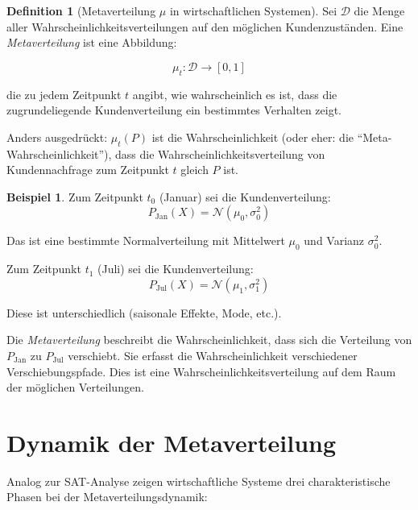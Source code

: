 \documentclass[12pt, a4paper, titlepage]{report}
\theoremstyle{definition}
\newtheorem{definition}[theorem]{Definition}
\newtheorem{example}[theorem]{Beispiel}
\theoremstyle{remark}
\begin{document}
\begin{definition}[Metaverteilung $\mu$ in wirtschaftlichen Systemen]
Sei $\mathcal{D}$ die Menge aller Wahrscheinlichkeitsverteilungen auf den möglichen Kundenzuständen. Eine \emph{Metaverteilung} ist eine Abbildung:

\begin{equation}
\mu_t: \mathcal{D} \to [0, 1]
\label{eq:metadistribution}
\end{equation}

die zu jedem Zeitpunkt $t$ angibt, wie wahrscheinlich es ist, dass die zugrundeliegende Kundenverteilung ein bestimmtes Verhalten zeigt.

Anders ausgedrückt: $\mu_t(P)$ ist die Wahrscheinlichkeit (oder eher: die ``Meta-Wahrscheinlichkeit''), dass die Wahrscheinlichkeitsverteilung von Kundennachfrage zum Zeitpunkt $t$ gleich $P$ ist.
\end{definition}

\begin{example}
Zum Zeitpunkt $t_0$ (Januar) sei die Kundenverteilung:
$$P_{\text{Jan}}(X) = \mathcal{N}(\mu_0, \sigma_0^2)$$

Das ist eine bestimmte Normalverteilung mit Mittelwert $\mu_0$ und Varianz $\sigma_0^2$.

Zum Zeitpunkt $t_1$ (Juli) sei die Kundenverteilung:
$$P_{\text{Jul}}(X) = \mathcal{N}(\mu_1, \sigma_1^2)$$

Diese ist unterschiedlich (saisonale Effekte, Mode, etc.).

Die \emph{Metaverteilung} beschreibt die Wahrscheinlichkeit, dass sich die Verteilung von $P_{\text{Jan}}$ zu $P_{\text{Jul}}$ verschiebt. Sie erfasst die Wahrscheinlichkeit verschiedener Verschiebungspfade. Dies ist eine Wahrscheinlichkeitsverteilung auf dem Raum der möglichen Verteilungen.
\end{example}

\section{Dynamik der Metaverteilung}

Analog zur SAT-Analyse zeigen wirtschaftliche Systeme drei charakteristische Phasen bei der Metaverteilungsdynamik:
\end{document}
